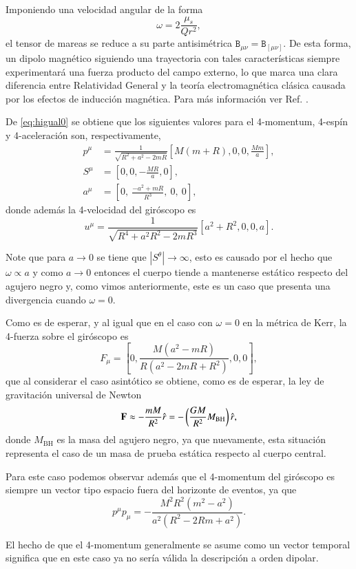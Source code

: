 Imponiendo una velocidad angular de la forma
\begin{equation}
\label{eq:angular-velocity-em}
\omega = 2 \frac{\mu_s}{Q r^2},
\end{equation}
el tensor de mareas se reduce a su parte antisimétrica $\mathtt{B}_{\mu \nu} = \mathtt{B}_{[\mu \nu]}$. De esta forma, un dipolo magnético siguiendo una trayectoria con tales características siempre experimentará una fuerza producto del campo externo, lo que marca una clara diferencia entre Relatividad General y la teoría electromagnética clásica causada por los efectos de inducción magnética. Para más información ver Ref. \cite{Costa-Herdeiro-Natario-Zilhao}.

De \eqref{eq:higual0} se obtiene que los siguientes valores para el 4-momentum, 4-espín y 4-aceleración son, respectivamente,
\begin{align}
\label{eq:ssc-mp-p}
p^{\mu} &= \frac{1}{\sqrt{R^2 + a^2 - 2mR}} \left[ M (m + R), 0, 0, \frac{M m}{a} \right],\\
\label{eq:ssc-mp-s}
S^{\mu} &= \left[ 0, 0, - \frac{MR}{a}, 0 \right],\\
a^{\mu} &= \left[ 0, \ \frac{- a^{2} + m R}{R^{3}}, \  0, \  0\right],
\end{align}
donde además la 4-velocidad del giróscopo es
\begin{equation}
\label{eq:4-velocitiy-helical}
u^{\mu} = \frac{1}{\sqrt{R^4 + a^2 R^2 - 2mR^3}} \left[ a^2 + R^2, 0, 0, a \right].
\end{equation}

Note que para $ a \to 0 $ se tiene que $ | S^{\theta} | \to \infty $, esto es causado por el hecho que $ \omega \propto a $ y como $ a \to 0 $ entonces el cuerpo tiende a mantenerse estático respecto del agujero negro y, como vimos anteriormente, este es un caso que presenta una divergencia cuando $\omega=0$.

Como es de esperar, y al igual que en el caso con $\omega=0$ en la métrica de Kerr, la 4-fuerza sobre el giróscopo es
\begin{equation}
\label{eq:124}
F_{\mu} = \left[ 0, \frac{M(a^2 - mR)}{R\left( a^2 - 2mR + R^2  \right)},0,0 \right],
\end{equation}
que al considerar el caso asintótico se obtiene, como es de esperar, la ley de gravitación universal de Newton
\begin{equation}
\vb{F} \approx -\frac{mM}{R^2} \hat{r} = -\left( \frac{GM}{R^2} M_{\mathrm{BH}} \right) \hat{r},
\end{equation}
donde $M_{\mathrm{BH}}$ es la masa del agujero negro, ya que nuevamente, esta situación representa el caso de un masa de prueba estática respecto al cuerpo central.

Para este caso podemos observar además que el 4-momentum del giróscopo es siempre un vector tipo espacio fuera del horizonte de eventos, ya que
\begin{equation}
p^{\mu} p_{\mu} = -\frac{M^{2} R^{2} \left(m^2 - a^2\right)}{a^{2} \left(R^{2} - 2 R m + a^{2}\right)}.
\end{equation}

El hecho de que el 4-momentum generalmente se asume como un vector temporal significa que en este caso ya no sería válida la descripción a orden dipolar.